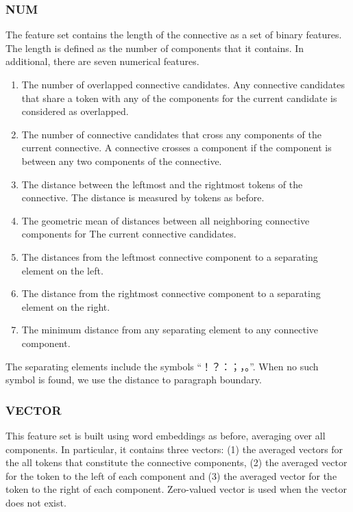 \subsubsection{NUM}

The feature set contains the length of the connective as a set
of binary features. The length is defined as the number of components
that it contains.
In additional, there are seven numerical features.
\begin{enumerate}
    \item The number of overlapped connective candidates. Any connective
        candidates that share a token with any of the components for the current
        candidate is considered as overlapped.
    \item The number of connective candidates that cross any
        components of the current connective. A connective crosses a component
        if the component is between any two components of the connective.
    \item The distance between the leftmost and the rightmost tokens of the connective.
        The distance is measured by tokens as before.
    \item The geometric mean of distances between all neighboring connective components for
        The current connective candidates.
    \item The distances from the leftmost connective component to a separating element on the left.
    \item The distance from the rightmost connective component to a separating element on the right.
    \item The minimum distance from any separating element to any connective component.
\end{enumerate}

The separating elements include the symbols ``！？：；，。''.
When no such symbol is found, we use the distance to paragraph boundary.

\subsubsection{VECTOR}

This feature set is built using word embeddings as before, averaging over all components.
In particular, it contains three vectors: (1) the averaged vectors
for the all tokens that constitute the connective components, (2) the averaged vector for the
token to the left of each component and (3) the averaged vector for the token to the
right of each component. Zero-valued vector is used when the vector does not exist.

